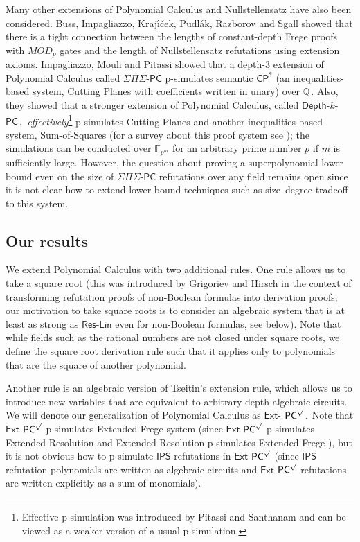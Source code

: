 \documentclass[11pt]{article}
\newcommand{\Q}{{\mathbb Q}}
\begin{document}
Many other extensions of Polynomial Calculus and Nullstellensatz have
%
also been considered.  %
Buss, Impagliazzo, Kraj{\'{\i}}{\v{c}}ek, Pudl{\'{a}}k, Razborov and Sgall \cite{BussIKPRS96} showed that there is a  tight connection between the lengths of constant-depth Frege  %
proofs with $MOD_p$ gates and the length of Nullstellensatz refutations using extension axioms. Impagliazzo,  Mouli and Pitassi \cite{IMP19_new} showed that a depth-3 extension of Polynomial Calculus called $\Sigma\Pi\Sigma$-$\mathsf{PC}$ p-simulates semantic $\mathsf{CP}^*$ (an inequalities-based system, Cutting Planes \cite{CCT87, CHVATAL1989455} with coefficients written in unary) over %
$\Q\,.$ %
 Also, they showed that a stronger extension of Polynomial Calculus, called $\mathsf{Depth}$-$k$-%
$\mathsf{PC}\,,$ %
 \textit{effectively}\footnote{Effective p-simulation was %
introduced  %
by Pitassi and Santhanam \cite{PS10}  and can be viewed as a weaker version of a usual p-simulation.} p-simulates Cutting Planes and another inequalities-based system, 
%
Sum-of-Squares   %
(for %
a   %
survey about this proof system see \cite{DBLP:journals/eccc/FlemingKP19}); the simulations can be conducted over $\mathbb{F}_{p^m}$ for an arbitrary prime number $p$ if $m$ is sufficiently large. However, the question about proving a %
superpolynomial 
%
lower bound even on the size of $\Sigma\Pi\Sigma$-$\mathsf{PC}$ refutations over any field remains open since it is not clear how
to extend %
lower-bound techniques  %
such as %
size--degree   %
tradeoff to this system.



\subsection{Our results}
We extend Polynomial Calculus with two additional rules. One rule allows us to take a square root
%
(this was  %
introduced by Grigoriev and Hirsch \cite{GH03} in the context of transforming refutation proofs of non-Boolean formulas into derivation proofs; our motivation to take square roots is to consider an algebraic system that is at least as strong as $\mathsf{Res}$-$\mathsf{Lin}$ even for non-Boolean formulas, see below).  %
Note that while fields such as the rational numbers are not closed under square roots, we define the square root derivation rule such that it applies only to polynomials that are the square of another polynomial. %

Another rule is an algebraic version of Tseitin's extension rule, which allows us to introduce new variables that are equivalent to arbitrary depth algebraic circuits. We will denote our generalization of Polynomial Calculus as $\mathsf{Ext}$-%
$\mathsf{PC}^{\surd}\,.$ %
 Note that $\mathsf{Ext}$-$\mathsf{PC}^{\surd}$ p-simulates Extended Frege system (since $\mathsf{Ext}$-$\mathsf{PC}^{\surd}$ p-simulates Extended Resolution and Extended Resolution p-simulates Extended Frege \cite{KP89}), but %
it is %
not obvious how to p-simulate $\mathsf{IPS}$ refutations in $\mathsf{Ext}$-$\mathsf{PC}^{\surd}$ (since $\mathsf{IPS}$ %
refutation  %
%
polynomials are written as algebraic circuits and $\mathsf{Ext}$-$\mathsf{PC}^{\surd}$ refutations are written explicitly as a sum of monomials).
\end{document}

